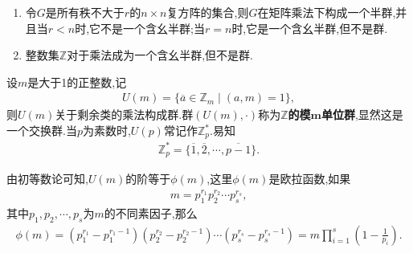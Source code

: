 \documentclass[../../main.tex]{subfiles}%
\begin{document}
\begin{example}
\begin{enumerate}[(1)]
\item 令$G$是所有秩不大于$r$的$n\times n$复方阵的集合,则$G$在矩阵乘法下构成一个半群,并且当$r < n$时,它不是一个含幺半群;当$r = n$时,它是一个含幺半群,但不是群.

\item 整数集$\mathbb{Z}$对于乘法成为一个含幺半群,但不是群.
\end{enumerate}
\end{example}

\begin{theorem}
设$m$是大于1的正整数,记
\begin{align*}
U(m) = \{ \overline{a} \in \mathbb{Z}_m \mid (a,m) = 1 \},
\end{align*}
则$U(m)$关于剩余类的乘法构成群.群$(U(m),\cdot)$称为\textbf{$\mathbb{Z}$的模$\boldsymbol{m}$单位群},显然这是一个交换群.当$p$为素数时,$U(p)$常记作$\mathbb{Z}_p^*$.易知
\begin{align*}
\mathbb{Z}_p^* = \{ \overline{1},\overline{2},\cdots,\overline{p-1} \}.
\end{align*}
\end{theorem}
\begin{remark}
由初等数论可知,$U(m)$的阶等于$\phi(m)$,这里$\phi(m)$是欧拉函数,如果
\begin{align*}
m = p_1^{r_1}p_2^{r_2}\cdots p_s^{r_s},
\end{align*}
其中$p_1,p_2,\cdots,p_s$为$m$的不同素因子,那么
\begin{align*}
\phi(m) = (p_1^{r_1} - p_1^{r_1 - 1})(p_2^{r_2} - p_2^{r_2 - 1})\cdots (p_s^{r_s} - p_s^{r_s - 1}) = m \prod\limits_{i=1}^s \left( 1 - \frac{1}{p_i} \right).
\end{align*}
\end{remark}
\end{document}
